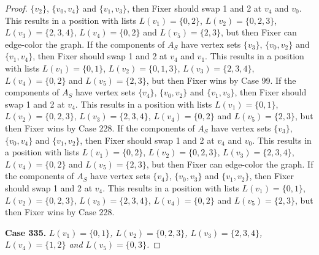 \documentclass[12pt]{amsart}
\theoremstyle{plain}
\theoremstyle{definition}
\theoremstyle{remark}
\begin{document}
\begin{proof}
$\{v_2\}$, $\{v_0, v_4\}$ and $\{v_1, v_3\}$, then Fixer should swap 1 and 2 at $v_4$ and $v_0$. This results in a position with lists $L(v_1) = \{0, 2\}$, $L(v_2) = \{0, 2, 3\}$, $L(v_3) = \{2, 3, 4\}$, $L(v_4) = \{0, 2\}$ and $L(v_5) = \{2, 3\}$, but then Fixer can edge-color the graph. If the components of $A_S$ have vertex sets $\{v_3\}$, $\{v_0, v_2\}$ and $\{v_1, v_4\}$, then Fixer should swap 1 and 2 at $v_4$ and $v_1$. This results in a position with lists $L(v_1) = \{0, 1\}$, $L(v_2) = \{0, 1, 3\}$, $L(v_3) = \{2, 3, 4\}$, $L(v_4) = \{0, 2\}$ and $L(v_5) = \{2, 3\}$, but then Fixer wins by Case 99. If the components of $A_S$ have vertex sets $\{v_4\}$, $\{v_0, v_2\}$ and $\{v_1, v_3\}$, then Fixer should swap 1 and 2 at $v_4$. This results in a position with lists $L(v_1) = \{0, 1\}$, $L(v_2) = \{0, 2, 3\}$, $L(v_3) = \{2, 3, 4\}$, $L(v_4) = \{0, 2\}$ and $L(v_5) = \{2, 3\}$, but then Fixer wins by Case 228. If the components of $A_S$ have vertex sets $\{v_3\}$, $\{v_0, v_4\}$ and $\{v_1, v_2\}$, then Fixer should swap 1 and 2 at $v_4$ and $v_0$. This results in a position with lists $L(v_1) = \{0, 2\}$, $L(v_2) = \{0, 2, 3\}$, $L(v_3) = \{2, 3, 4\}$, $L(v_4) = \{0, 2\}$ and $L(v_5) = \{2, 3\}$, but then Fixer can edge-color the graph. If the components of $A_S$ have vertex sets $\{v_4\}$, $\{v_0, v_3\}$ and $\{v_1, v_2\}$, then Fixer should swap 1 and 2 at $v_4$. This results in a position with lists $L(v_1) = \{0, 1\}$, $L(v_2) = \{0, 2, 3\}$, $L(v_3) = \{2, 3, 4\}$, $L(v_4) = \{0, 2\}$ and $L(v_5) = \{2, 3\}$, but then Fixer wins by Case 228. 

\noindent\textbf{Case 335.  }\textit{$L(v_1) = \{0, 1\}$, $L(v_2) = \{0, 2, 3\}$, $L(v_3) = \{2, 3, 4\}$, $L(v_4) = \{1, 2\}$ and $L(v_5) = \{0, 3\}$.}


\end{proof}
\end{document}
